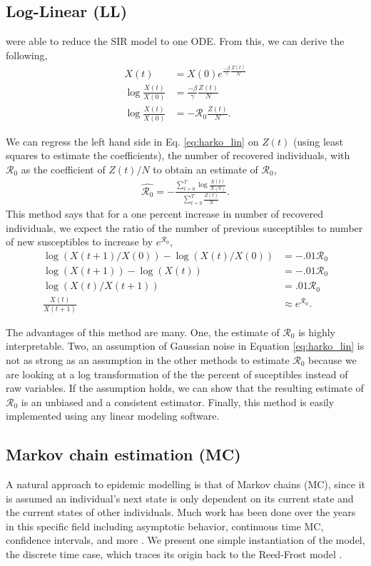 \documentclass[12pt]{article}
\newcommand{\rr}{\ensuremath{\mathcal{R}_0}}
\begin{document}
\subsection{Log-Linear (LL)}
\cite{harko2014exact} were able to reduce the SIR model to one ODE.  From this, we can derive the following,
\begin{align}
  X(t) &=  X(0) e^{\frac{-\beta}{\gamma}\frac{Z(t)}{N}} \nonumber\\
  \log \frac{X(t)}{X(0)} &=  \frac{-\beta }{\gamma}\frac{Z(t)}{N} \nonumber\\
  \log \frac{X(t)}{X(0)} &=  -\rr \frac{Z(t)}{N}. \label{eq:harko_lin}
\end{align}

We can regress the left hand side in Eq. \ref{eq:harko_lin} on $Z(t)$ (using least squares to estimate the coefficients), the number of recovered individuals, with $\rr$ as the coefficient of $Z(t)/N$ to obtain an estimate of $\rr$,
\begin{align*}
  \hat{\rr} = -\frac{\sum_{t=0}^T \log \frac{ X(t)}{X(0)}}{\sum_{t=0}^T\frac{Z(t)}{N}}.
\end{align*}
This method says that for a one percent increase in number of recovered individuals, we expect the ratio of the number of previous susceptibles to number of new susceptibles to increase by $e^{\rr}$,
\begin{align*}
  \log \left ( X(t+1)/ X(0) \right ) - \log \left ( X(t)/X(0) \right ) &= - .01\rr\\
  \log \left ( X(t+1) \right ) - \log \left ( X(t) \right )  &=- .01\rr\\
  \log \left ( X(t) / X(t+1) \right ) &= .01\rr\\
  \frac{X(t)}{X(t+1)}  &\approx e^{\rr}.
\end{align*}

The advantages of this method are many.  One, the estimate of $\rr$ is highly interpretable.  Two, an assumption of Gaussian noise in Equation \ref{eq:harko_lin} is not as strong as an assumption in the other methods to estimate $\rr$ because we are looking at a log transformation of the the percent of suceptibles instead of raw variables.  If the assumption holds, we can show that the resulting estimate of $\rr$ is an unbiased and a consistent estimator.  Finally,  this method is easily implemented using any linear modeling software.  

\subsection{Markov chain estimation (MC)}
A natural approach to epidemic modelling is that of Markov chains (MC), since it is assumed an individual's next state is only dependent on its current state and the current states of other individuals.  Much work has been done over the years in this specific field including asymptotic behavior, continuous time MC, confidence intervals, and more \citep{jacquez1991,gani1995,daley2001epidemic}.  We present one simple instantiation of the model, the discrete time case, which traces its origin back to the Reed-Frost model \citep{abbey1952}.
\end{document}
